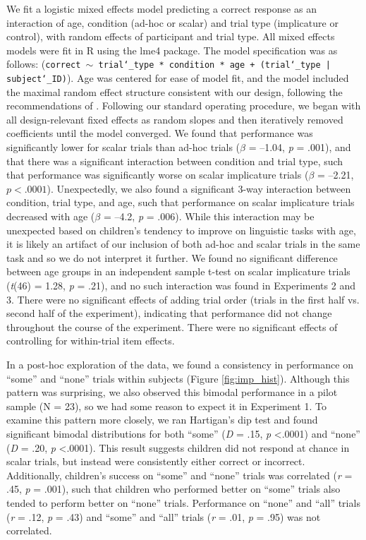 \documentclass[man]{apa2}
\begin{document}
We fit a logistic mixed effects model predicting a correct response as an interaction of age, condition (ad-hoc or scalar) and trial type (implicature or control), with random effects of participant and trial type. All mixed effects models were fit in R using the lme4 package. The model specification was as follows: ({\tt{correct $\sim$ trial\char`_type * condition * age + (trial\char`_type | subject\char`_ID)}}). Age was centered for ease of model fit, and the model included the maximal random effect structure consistent with our design, following the recommendations of . Following our standard operating procedure, we began with all design-relevant fixed effects as random slopes and then iteratively removed coefficients until the model converged. We found that performance was significantly lower for scalar trials than ad-hoc trials ($\beta$ = --1.04, \textit{p} = .001), and that there was a significant interaction between condition and trial type, such that performance was significantly worse on scalar implicature trials ($\beta$ = --2.21, $p < .0001$). Unexpectedly, we also found a significant 3-way interaction between condition, trial type, and age, such that performance on scalar implicature trials decreased with age ($\beta$ = --4.2, \textit{p} = .006). While this interaction may be unexpected based on children's tendency to improve on linguistic tasks with age, it is likely an artifact of our inclusion of both ad-hoc and scalar trials in the same task and so we do not interpret it further. We found no significant difference between age groups in an independent sample t-test on scalar implicature trials (\emph{t}(46) = 1.28, \emph{p} = .21), and no such interaction was found in Experiments 2 and 3. There were no significant effects of adding trial order (trials in the first half vs. second half of the experiment), indicating that performance did not change throughout the course of the experiment. There were no significant effects of controlling for within-trial item effects.

In a post-hoc exploration of the data, we found a consistency in performance on ``some'' and ``none'' trials within subjects (Figure \ref{fig:imp_hist}). Although this pattern was surprising, we also observed this bimodal performance in a pilot sample (N = 23), so we had some reason to expect it in Experiment 1. To examine this pattern more closely, we ran Hartigan's dip test and found significant bimodal distributions for both ``some'' (\textit{D} = .15, \textit{p} \textless  .0001) and ``none'' (\textit{D} = .20, \textit{p} \textless  .0001). This result suggests children did not respond at chance in scalar trials, but instead were consistently either correct or incorrect. Additionally, children's success on ``some'' and ``none'' trials was correlated (\textit{r} = .45, \textit{p} =  .001), such that children who performed better on ``some'' trials also tended to perform better on ``none'' trials. Performance on ``none'' and ``all'' trials (\textit{r} = .12, \textit{p} = .43) and ``some'' and ``all'' trials (\textit{r} = .01, \textit{p} = .95) was not correlated.
\end{document}
